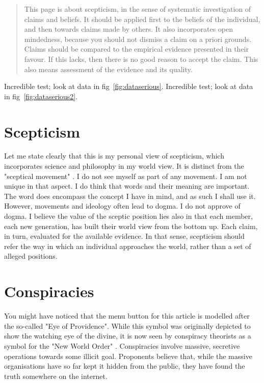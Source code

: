 \begin{abstract}
This page is about scepticism, in the sense of systematic investigation of claims and beliefs. It should be applied first to the beliefs
of the individual, and then towards claims made by others. It also incorporates open mindedness, because you should not dismiss a claim
on a priori grounds. Claims should be compared to the empirical evidence presented in their favour. If this lacks, then there is no good
reason to accept the claim. This also means assessment of the evidence and its quality.
\end{abstract}
\begin{multicols}{2}


Incredible test; look at data in fig~\ref{fig:dataserious}. Incredible test; look at data in fig~\ref{fig:dataserious2}.

\section{Scepticism}

Let me state clearly that this is my personal view of scepticism, which incorporates science and philosophy in my world view. It is distinct
from the "sceptical movement" \cite{wikism}. I do not see myself as 
part of any movement. I am not unique in that aspect. I do think that words and their meaning are important. The word does encompass the
concept I have in mind, and as such I shall use it. However, movements and ideology often lead to dogma. I do not approve of dogma. I believe
the value of the sceptic position lies also in that each member, each new generation, has built their world view from the bottom up. Each claim,
in turn, evaluated for the available evidence. In that sense, scepticism should refer the way in which an individual approaches the world, rather
than a set of alleged positions.

\section{Conspiracies}

You might have noticed that the menu button for this article is modelled after the so-called "Eye of Providence". While this symbol was originally
depicted to show the watching eye of the divine, it is now seen by conspiracy theorists as a symbol for the "New World Order" \cite{wikinwo}.
Conspiracies involve massive, secretive operations towards some illicit goal. Proponents believe that, while the massive
organisations have so far kept it hidden from the public, they have found the truth somewhere on the internet.



\end{multicols}
